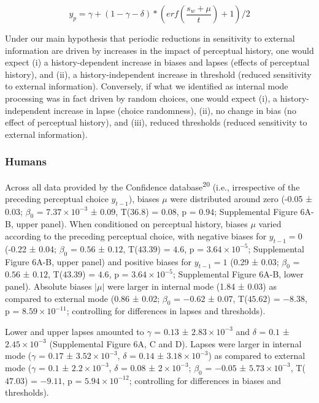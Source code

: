 \documentclass[
]{article}
\begin{document}
\begin{equation}
y_p = \gamma + (1 - \gamma - \delta) *  (erf(\frac{s_w + \mu}{t}) + 1) / 2
\end{equation}

Under our main hypothesis that periodic reductions in sensitivity to
external information are driven by increases in the impact of perceptual
history, one would expect (i) a history-dependent increase in biases and
lapses (effects of perceptual history), and (ii), a history-independent
increase in threshold (reduced sensitivity to external information).
Conversely, if what we identified as internal mode processing was in
fact driven by random choices, one would expect (i), a
history-independent increase in lapse (choice randomness), (ii), no
change in bias (no effect of perceptual history), and (iii), reduced
thresholds (reduced sensitivity to external information).

\hypertarget{humans}{%
\subsubsection{Humans}\label{humans}}

Across all data provided by the Confidence database\textsuperscript{20}
(i.e., irrespective of the preceding perceptual choice \(y_{t-1}\)),
biases \(\mu\) were distributed around zero (-0.05 ± 0.03; \(\beta_0\) =
\(\ensuremath{7.37\times 10^{-3}}\) ± \(0.09\), T(\(36.8\)) = \(0.08\),
p = \(0.94\); Supplemental Figure 6A-B, upper panel). When conditioned
on perceptual history, biases \(\mu\) varied according to the preceding
perceptual choice, with negative biases for \(y_{t-1} = 0\) (-0.22 ±
0.04; \(\beta_0\) = \(0.56\) ± \(0.12\), T(\(43.39\)) = \(4.6\), p =
\(\ensuremath{3.64\times 10^{-5}}\); Supplemental Figure 6A-B, upper
panel) and positive biases for \(y_{t-1} = 1\) (0.29 ± 0.03; \(\beta_0\)
= \(0.56\) ± \(0.12\), T(\(43.39\)) = \(4.6\), p =
\(\ensuremath{3.64\times 10^{-5}}\); Supplemental Figure 6A-B, lower
panel). Absolute biases \(|\mu|\) were larger in internal mode (1.84 ±
0.03) as compared to external mode (0.86 ± 0.02; \(\beta_0\) = \(-0.62\)
± \(0.07\), T(\(45.62\)) = \(-8.38\), p =
\(\ensuremath{8.59\times 10^{-11}}\); controlling for differences in
lapses and thresholds).

Lower and upper lapses amounted to \(\gamma\) = \(0.13\) ±
\(\ensuremath{2.83\times 10^{-3}}\) and \(\delta\) = \(0.1\) ±
\(\ensuremath{2.45\times 10^{-3}}\) (Supplemental Figure 6A, C and D).
Lapses were larger in internal mode (\(\gamma\) = \(0.17\) ±
\(\ensuremath{3.52\times 10^{-3}}\), \(\delta\) = \(0.14\) ±
\(\ensuremath{3.18\times 10^{-3}}\)) as compared to external mode
(\(\gamma\) = \(0.1\) ± \(\ensuremath{2.2\times 10^{-3}}\), \(\delta\) =
\(0.08\) ± \(\ensuremath{2\times 10^{-3}}\); \(\beta_0\) = \(-0.05\) ±
\(\ensuremath{5.73\times 10^{-3}}\), T(\(47.03\)) = \(-9.11\), p =
\(\ensuremath{5.94\times 10^{-12}}\); controlling for differences in
biases and thresholds).
\end{document}
